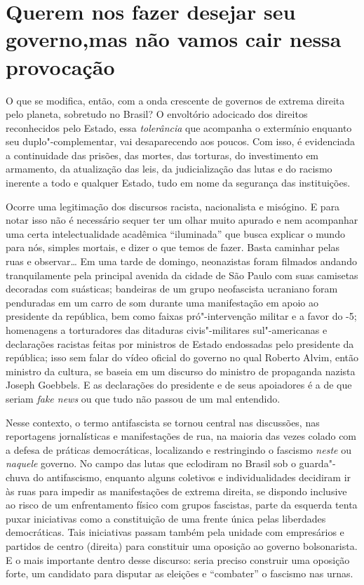 \section{Querem nos fazer desejar seu governo,\break mas não vamos cair nessa provocação}

O que se modifica, então, com a onda crescente de governos de
extrema direita pelo planeta, sobretudo no Brasil? O envoltório
adocicado dos direitos reconhecidos pelo Estado, essa \emph{tolerância}
que acompanha o extermínio enquanto seu duplo"-complementar, vai
desaparecendo aos poucos. Com isso, é evidenciada a continuidade das
prisões, das mortes, das torturas, do investimento em armamento, da
atualização das leis, da judicialização das lutas e do racismo inerente
a todo e qualquer Estado, tudo em nome da segurança das instituições.

Ocorre uma legitimação dos discursos racista, nacionalista e misógino. E
para notar isso não é necessário sequer ter um olhar muito apurado e nem
acompanhar uma certa intelectualidade acadêmica ``iluminada'' que busca
explicar o mundo para nós, simples mortais, e dizer o que temos de
fazer. Basta caminhar pelas ruas e observar\ldots{} Em uma tarde de domingo,
neonazistas foram filmados andando tranquilamente pela principal avenida
da cidade de São Paulo com suas camisetas decoradas com suásticas;
bandeiras de um grupo neofascista ucraniano foram penduradas em um carro
de som durante uma manifestação em apoio ao presidente da república, bem
como faixas pró"-intervenção militar e a favor do -5; homenagens a
torturadores das ditaduras civis"-militares sul"-americanas e declarações
racistas feitas por ministros de Estado endossadas pelo presidente da
república; isso sem falar do vídeo oficial do governo no qual Roberto
Alvim, então ministro da cultura, se baseia em um discurso do ministro
de propaganda nazista Joseph Goebbels. E as declarações do presidente e
de seus apoiadores é a de que seriam \emph{fake news} ou que tudo não
passou de um mal entendido.

Nesse contexto, o termo antifascista se tornou central nas discussões,
nas reportagens jornalísticas e manifestações de rua, na maioria das
vezes colado com a defesa de práticas democráticas, localizando e
restringindo o fascismo \emph{neste} ou \emph{naquele} governo. No campo
das lutas que eclodiram no Brasil sob o guarda"-chuva do antifascismo,
enquanto alguns coletivos e individualidades decidiram ir às ruas para
impedir as manifestações de extrema direita, se dispondo inclusive ao
risco de um enfrentamento físico com grupos fascistas, parte da esquerda
tenta puxar iniciativas como a constituição de uma frente única pelas
liberdades democráticas. Tais iniciativas passam também pela unidade com
empresários e partidos de centro (direita) para constituir uma oposição
ao governo bolsonarista. E o mais importante dentro desse discurso:
seria preciso construir uma oposição forte, um candidato para disputar
as eleições e ``combater'' o fascismo nas urnas.

